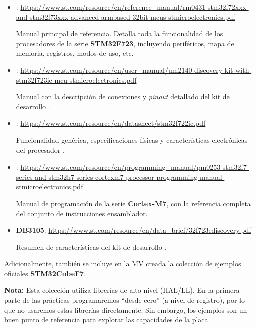 \documentclass[../main.tex]{subfiles}
\begin{document}
        \begin{itemize}
            \item \REFMAN : \url{https://www.st.com/resource/en/reference_manual/rm0431-stm32f72xxx-and-stm32f73xxx-advanced-armbased-32bit-mcus-stmicroelectronics.pdf}
            
                Manual principal de referencia. Detalla toda la funcionalidad de los procesadores de la serie \textbf{STM32F723}, incluyendo periféricos, mapa de memoria, registros, modos de uso, etc.

            \item \BRDMAN : \url{https://www.st.com/resource/en/user_manual/um2140-discovery-kit-with-stm32f723ie-mcu-stmicroelectronics.pdf}
            
                Manual con la descripción de conexiones y \textit{pinout} detallado del kit de desarrollo \BOARD.

            \item \DSMAN : \url{https://www.st.com/resource/en/datasheet/stm32f722ic.pdf}

                Funcionalidad genérica, especificaciones físicas y características electrónicas del procesador \MCU.
            
            \item \PMMAN : \url{https://www.st.com/resource/en/programming_manual/pm0253-stm32f7-series-and-stm32h7-series-cortexm7-processor-programming-manual-stmicroelectronics.pdf}
            
                Manual de programación de la serie \textbf{Cortex-M7}, con la referencia completa del conjunto de instrucciones ensamblador.

            \item \textbf{DB3105}: \url{https://www.st.com/resource/en/data_brief/32f723ediscovery.pdf}

                Resumen de características del kit de desarrollo \BOARD.    
        \end{itemize}

        Adicionalmente, también se incluye en la MV creada la colección de ejemplos oficiales \textbf{STM32CubeF7}.

        \textbf{Nota:} Esta colección utiliza librerías de alto nivel (HAL/LL). En la primera parte de las prácticas programaremos ``desde cero'' (a nivel de registro), por lo que no usaremos estas librerías directamente. Sin embargo, los ejemplos son un buen punto de referencia para explorar las capacidades de la placa.
\end{document}
